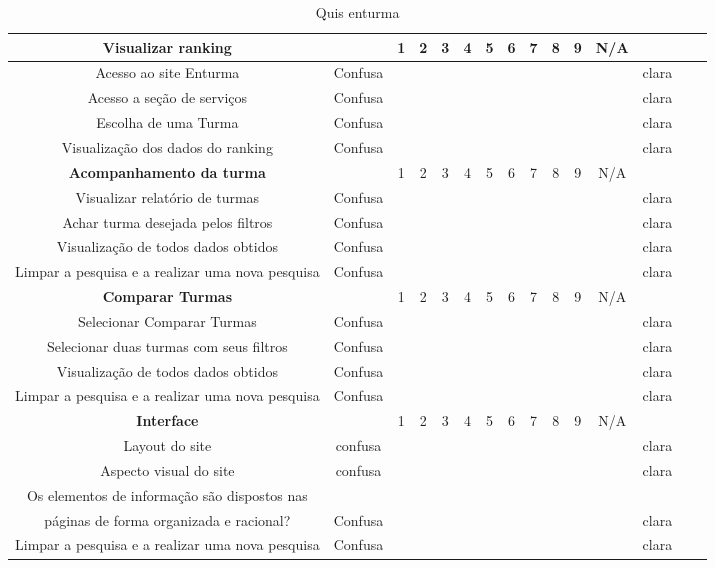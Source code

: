 \begin{itemize}
\begin{table}[H]
\begin{tabular}{|c|c|c|c|c|c|c|c|c|c|c|c|c|c|c|}
		\hline
		   \textbf{Visualizar ranking} &  & 1 & 2 & 3 & 4 & 5 & 6 & 7 & 8 & 9 & N/A &  \\
		\hline
		   Acesso ao site Enturma & Confusa &  &  &  &  &  &  &  &  &  &  & clara \\ 
		\hline
		 Acesso a seção de serviços  & Confusa &  &  &  &  &  &  &  &  &  &  & clara \\ 
		\hline
		 Escolha de uma Turma  & Confusa &  &  &  &  &  &  &  &  &  &  & clara \\ 
		\hline
		 Visualização dos dados do ranking & Confusa &  &  &  &  &  &  &  &  &  &  & clara \\ 
		\hline
		   \textbf{Acompanhamento da turma} &  & 1 & 2 & 3 & 4 & 5 & 6 & 7 & 8 & 9 & N/A &  \\
		\hline
		 Visualizar relatório de turmas & Confusa &  &  &  &  &  &  &  &  &  &  & clara \\ 
		\hline
		  Achar turma desejada pelos filtros & Confusa &  &  &  &  &  &  &  &  &  &  & clara \\ 
		\hline
		  Visualização de todos dados obtidos & Confusa &  &  &  &  &  &  &  &  &  &  & clara \\ 
		\hline
		  Limpar a pesquisa e a realizar uma nova pesquisa & Confusa &  &  &  &  &  &  &  &  &  &  & clara \\ \hline
		\textbf{Comparar Turmas} &  & 1 & 2 & 3 & 4 & 5 & 6 & 7 & 8 & 9 & N/A &  \\
		\hline  
		  Selecionar Comparar Turmas & Confusa &  &  &  &  &  &  &  &  &  &  & clara \\ 
		\hline
		  Selecionar duas turmas com seus filtros & Confusa &  &  &  &  &  &  &  &  &  &  & clara \\ 
		\hline
		 Visualização de todos dados obtidos & Confusa &  &  &  &  &  &  &  &  &  &  & clara \\ 
		\hline
		Limpar a pesquisa e a realizar uma nova pesquisa & Confusa &  &  &  &  &  &  &  &  &  &  & clara \\ 
		\hline
		\textbf{Interface} &  & 1 & 2 & 3 & 4 & 5 & 6 & 7 & 8 & 9 & N/A &  \\
		\hline  
		  Layout do site & confusa &  &  &  &  &  &  &  &  &  &  & clara \\ 
		\hline
		  Aspecto visual do site & confusa &  &  &  &  &  &  &  &  &  &  & clara \\ 
		\hline
		  Os elementos de informação são dispostos nas\\ páginas de forma organizada e racional?  & Confusa &  &  &  &  &  &  &  &  &  &  & clara \\ 
		\hline
		Limpar a pesquisa e a realizar uma nova pesquisa & Confusa &  &  &  &  &  &  &  &  &  &  & clara \\ 
		\hline

	\end{tabular}
	\caption {Quis enturma}

\end{table}

\end{itemize}